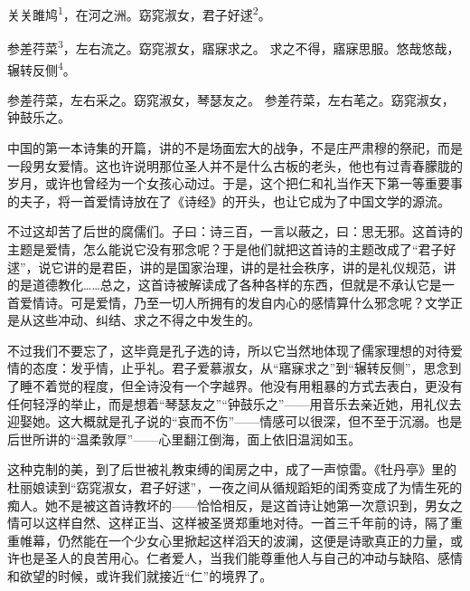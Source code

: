 
\begin{poem}
关关雎鸠\textsuperscript{1}，在河之洲。窈窕淑女，君子好逑\textsuperscript{2}。

参差荇菜\textsuperscript{3}，左右流之。窈窕淑女，寤寐求之。
求之不得，寤寐思服。悠哉悠哉，辗转反侧\textsuperscript{4}。

参差荇菜，左右采之。窈窕淑女，琴瑟友之。
参差荇菜，左右芼之。窈窕淑女，钟鼓乐之。
\end{poem}

\begin{annotations}
\end{annotations}

\begin{appreciation}
中国的第一本诗集的开篇，讲的不是场面宏大的战争，不是庄严肃穆的祭祀，而是一段男女爱情。这也许说明那位圣人并不是什么古板的老头，他也有过青春朦胧的岁月，或许也曾经为一个女孩心动过。于是，这个把仁和礼当作天下第一等重要事的夫子，将一首爱情诗放在了《诗经》的开头，也让它成为了中国文学的源流。

不过这却苦了后世的腐儒们。子曰：诗三百，一言以蔽之，曰：思无邪。这首诗的主题是爱情，怎么能说它没有邪念呢？于是他们就把这首诗的主题改成了“君子好逑”，说它讲的是君臣，讲的是国家治理，讲的是社会秩序，讲的是礼仪规范，讲的是道德教化……总之，这首诗被解读成了各种各样的东西，但就是不承认它是一首爱情诗。可是爱情，乃至一切人所拥有的发自内心的感情算什么邪念呢？文学正是从这些冲动、纠结、求之不得之中发生的。

不过我们不要忘了，这毕竟是孔子选的诗，所以它当然地体现了儒家理想的对待爱情的态度：发乎情，止乎礼。君子爱慕淑女，从“寤寐求之”到“辗转反侧”，思念到了睡不着觉的程度，但全诗没有一个字越界。他没有用粗暴的方式去表白，更没有任何轻浮的举止，而是想着“琴瑟友之”“钟鼓乐之”——用音乐去亲近她，用礼仪去迎娶她。这大概就是孔子说的“哀而不伤”——情感可以很深，但不至于沉溺。也是后世所讲的“温柔敦厚”——心里翻江倒海，面上依旧温润如玉。

这种克制的美，到了后世被礼教束缚的闺房之中，成了一声惊雷。《牡丹亭》里的杜丽娘读到“窈窕淑女，君子好逑”，一夜之间从循规蹈矩的闺秀变成了为情生死的痴人。她不是被这首诗教坏的——恰恰相反，是这首诗让她第一次意识到，男女之情可以这样自然、这样正当、这样被圣贤郑重地对待。一首三千年前的诗，隔了重重帷幕，仍然能在一个少女心里掀起这样滔天的波澜，这便是诗歌真正的力量，或许也是圣人的良苦用心。仁者爱人，当我们能尊重他人与自己的冲动与缺陷、感情和欲望的时候，或许我们就接近“仁”的境界了。
\end{appreciation}
